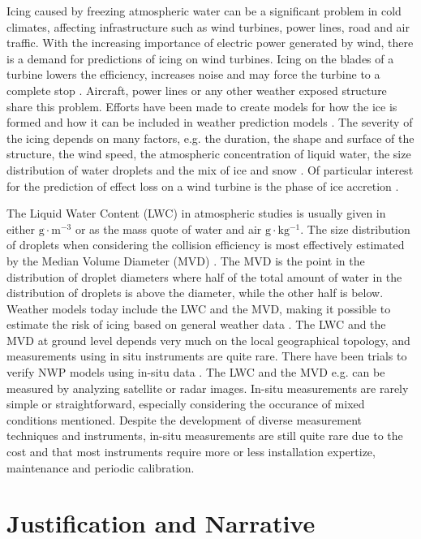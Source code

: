 Icing caused by freezing atmospheric water can be a significant problem in cold climates, affecting infrastructure such as wind turbines, power lines, road and air traffic. With the increasing importance of electric power generated by wind, there is a demand for predictions of icing on wind turbines. Icing on the blades of a turbine lowers the efficiency, increases noise and may force the turbine to a complete stop \cite{dalili2009,cost727,homo2012,jasin1998}. Aircraft, power lines or any other weather exposed structure share this problem. Efforts have been made to create models for how the ice is formed \cite{makk2000,makk2001,shin1992} and how it can be included in weather prediction models \cite{thomp2009,kring2011}. The severity of the icing depends on many factors, e.g. the duration, the shape and surface of the structure, the wind speed, the atmospheric concentration of liquid water, the size distribution of water droplets and the mix of ice and snow \cite{kring2011,makk2000,makk2001,homo2010,han2012}. Of particular interest for the prediction of effect loss on a wind turbine is the phase of ice accretion \cite{davis2013}.

The Liquid Water Content (LWC) in atmospheric studies is usually given in either $\mathrm{g\cdot m^{-3}}$ \cite{sein1998} or as the mass quote of water and air $\mathrm{g\cdot kg^{-1}}$. The size distribution of droplets when considering the collision efficiency is most effectively estimated by the Median Volume Diameter (MVD) \cite{fins1988}. The MVD is the point in the distribution of droplet diameters where half of the total amount of water in the distribution of droplets is above the diameter, while the other half is below. Weather models today include the LWC and the MVD, making it possible to estimate the risk of icing based on general weather data \cite{thomp2009}. The LWC and the MVD at ground level depends very much on the local geographical topology, and measurements using in situ instruments are quite rare. There have been trials to verify NWP models using in-situ data \cite{berg2013}. The LWC and the MVD e.g. can be measured by analyzing satellite or radar images. In-situ measurements are rarely simple or straightforward, especially considering the occurance of mixed conditions mentioned. Despite the development of diverse measurement techniques and instruments, in-situ measurements are still quite rare due to the cost and that most instruments require more or less installation expertize, maintenance and periodic calibration.

\section{Justification and Narrative}

